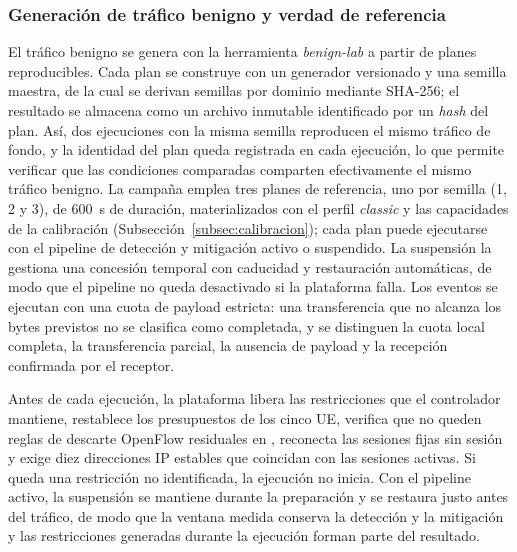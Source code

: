 \subsubsection{Generación de tráfico benigno y verdad de referencia}

El tráfico benigno se genera con la herramienta \textit{benign-lab} a partir de planes reproducibles. Cada plan se construye con un generador versionado y una semilla maestra, de la cual se derivan semillas por dominio mediante SHA-256; el resultado se almacena como un archivo inmutable identificado por un \textit{hash} del plan. Así, dos ejecuciones con la misma semilla reproducen el mismo tráfico de fondo, y la identidad del plan queda registrada en cada ejecución, lo que permite verificar que las condiciones comparadas comparten efectivamente el mismo tráfico benigno. La campaña emplea tres planes de referencia, uno por semilla (1, 2 y 3), de 600~s de duración, materializados con el perfil \textit{classic} y las capacidades de la calibración (Subsección~\ref{subsec:calibracion}); cada plan puede ejecutarse con el pipeline de detección y mitigación activo o suspendido. La suspensión la gestiona una concesión temporal con caducidad y restauración automáticas, de modo que el pipeline no queda desactivado si la plataforma falla. Los eventos se ejecutan con una cuota de payload estricta: una transferencia que no alcanza los bytes previstos no se clasifica como completada, y se distinguen la cuota local completa, la transferencia parcial, la ausencia de payload y la recepción confirmada por el receptor.

Antes de cada ejecución, la plataforma libera las restricciones que el controlador mantiene, restablece los presupuestos de los cinco UE, verifica que no queden reglas de descarte OpenFlow residuales en , reconecta las sesiones fijas sin sesión y exige diez direcciones IP estables que coincidan con las sesiones activas. Si queda una restricción no identificada, la ejecución no inicia. Con el pipeline activo, la suspensión se mantiene durante la preparación y se restaura justo antes del tráfico, de modo que la ventana medida conserva la detección y la mitigación y las restricciones generadas durante la ejecución forman parte del resultado.

